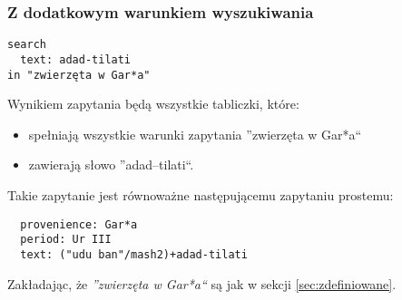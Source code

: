 \subsubsection{Z dodatkowym warunkiem wyszukiwania}
\begin{verbatim}
search
  text: adad-tilati
in "zwierzęta w Gar*a"
\end{verbatim}
Wynikiem zapytania będą wszystkie tabliczki, które:
\begin{itemize}
 \item spełniają wszystkie warunki zapytania ''zwierzęta w Gar*a``
\item zawierają słowo ''adad--tilati``.
\end{itemize}
Takie zapytanie jest równoważne następującemu zapytaniu prostemu:
\begin{verbatim}
  provenience: Gar*a
  period: Ur III
  text: ("udu ban"/mash2)+adad-tilati
\end{verbatim}
Zakładając, że \textit{''zwierzęta w Gar*a``} są jak w sekcji \ref{sec:zdefiniowane}.

